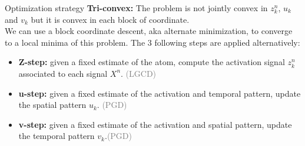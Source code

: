 \documentclass{beamer}
\def\keypoint#1{\hspace{0pt plus 1 filll}\textcolor{gray}{#1}}
\begin{document}
\begin{frame}{Optimization strategy}
\textbf{Tri-convex:} The problem is not jointly convex in $z^n_k$, $u_k$ and $v_k$ but it is convex in each block of coordinate.\\[1em]

We can use a block coordinate descent, aka alternate minimization, to converge to a local minima of this problem. The 3 following steps are applied alternatively:

\begin{itemize}
	\item \textbf{Z-step:} given a fixed estimate of the atom, compute the activation signal $z^n_k$ associated to each signal $X^n$. \keypoint{(LGCD)}
	\item \textbf{u-step:} given a fixed estimate of the activation and temporal pattern, update the spatial pattern $u_k$. \keypoint{(PGD)}
	\item \textbf{v-step:} given a fixed estimate of the activation and spatial pattern, update the temporal pattern $v_k$.\keypoint{(PGD)}
\end{itemize}
\end{frame}



\end{document}
